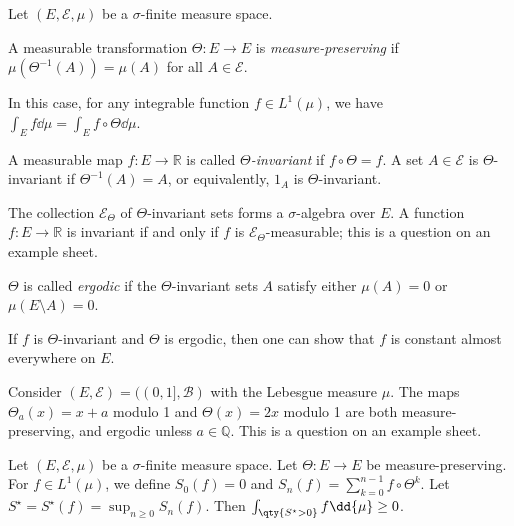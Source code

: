 Let $(E, \mathcal E, \mu)$ be a $\sigma$-finite measure space.
\begin{definition}
	A measurable transformation $\Theta \colon E \to E$ is \emph{measure-preserving} if $\mu(\Theta^{-1}(A)) = \mu(A)$ for all $A \in \mathcal E$.
\end{definition}
In this case, for any integrable function $f \in L^1(\mu)$, we have $\int_E f \dd{\mu} = \int_E f \circ \Theta \dd{\mu}$.
\begin{definition}
	A measurable map $f \colon E \to \mathbb R$ is called \emph{$\Theta$-invariant} if $f \circ \Theta = f$.
	A set $A \in \mathcal E$ is $\Theta$-invariant if $\Theta^{-1}(A) = A$, or equivalently, $1_A$ is $\Theta$-invariant.
\end{definition}
The collection $\mathcal E_\Theta$ of $\Theta$-invariant sets forms a $\sigma$-algebra over $E$.
A function $f \colon E \to \mathbb R$ is invariant if and only if $f$ is $\mathcal E_\Theta$-measurable; this is a question on an example sheet.
\begin{definition}
	$\Theta$ is called \emph{ergodic} if the $\Theta$-invariant sets $A$ satisfy either $\mu(A) = 0$ or $\mu(E \setminus A) = 0$.
\end{definition}
If $f$ is $\Theta$-invariant and $\Theta$ is ergodic, then one can show that $f$ is constant almost everywhere on $E$.
\begin{example}
	Consider $(E, \mathcal E) = ((0,1], \mathcal B)$ with the Lebesgue measure $\mu$.
	The maps $\Theta_a(x) = x + a$ modulo 1 and $\Theta(x) = 2x$ modulo 1 are both measure-preserving, and ergodic unless $a \in \mathbb Q$.
	This is a question on an example sheet.
\end{example}
\begin{lemma}
    Let $(E, \mathcal E, \mu)$ be a $\sigma$-finite measure space.
	Let $\Theta \colon E \to E$ be measure-preserving.
	For $f \in L^1(\mu)$, we define $S_0(f) = 0$ and $S_n(f) = \sum_{k=0}^{n-1} f \circ \Theta^k$.
    Let $S^\star = S^\star(f) = \sup_{n \geq 0} S_n(f)$.
    Then $\int_{\qty{S^\star > 0}} f \dd{\mu} \geq 0$.
\end{lemma}
